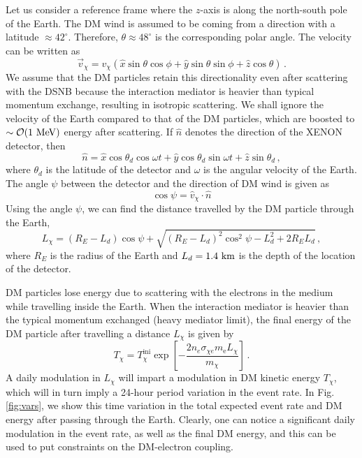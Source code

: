 \documentclass[prd,aps,twocolumn,tightenlines,notitlepage,nofootinbib,preprintnumbers,letterpaper,superscriptaddress]{revtex4-2}
\newcommand{\km}{{\rm\ km}}
\newcommand{\MeV}{{\rm\ MeV}}
\newcommand{\mchi}{m_\chi}
\newcommand{\sce}{\sigma_{\chi e}}
\newcommand{\mel}{m_\mathrm{e}}
\begin{document}
Let us consider a reference frame where the $z$-axis is along the north-south pole of the Earth. The DM wind is assumed to be coming from a direction with a latitude $\approx 42^\circ$. Therefore, $\theta \approx 48^\circ$ is the corresponding polar angle. The velocity can be written as
\begin{equation}
    \Vec{v}_\chi = v_\chi (\hat{x} \sin\theta \cos\phi + \hat{y} \sin\theta \sin\phi + \hat{z} \cos\theta)\,.
\end{equation}
We assume that the DM particles retain this directionality even after scattering with the DSNB because the interaction mediator is heavier than typical momentum exchange, resulting in isotropic scattering. We shall ignore the velocity of the Earth compared to that of the DM particles, which are boosted to $\sim \mathcal{O}(1\MeV)$ energy after scattering. If $\hat{n}$ denotes the direction of the XENON detector, then
\begin{equation}
    \hat{n} = \hat{x} \cos{\theta_d} \cos{\omega t} + \hat{y} \cos{\theta_d} \sin{\omega t} + \hat{z} \sin{\theta_d}\,,
\end{equation}
where $\theta_d$ is the latitude of the detector and $\omega$ is the angular velocity of the Earth. The angle $\psi$ between the detector and the direction of DM wind is given as
\begin{equation}
    \cos\psi = \hat{v}_\chi\cdot\hat{n} 
\end{equation}
Using the angle $\psi$, we can find the distance travelled by the DM particle through the Earth,
\begin{equation}
    L_\chi = (R_E - L_d)\cos\psi + \sqrt{(R_E - L_d)^2\cos^2\psi - L_d^2 + 2R_EL_d}\,,
\end{equation}
where $R_E$ is the radius of the Earth and $L_d=1.4\km$ is the depth of the location of the detector.

DM particles lose energy due to scattering with the electrons in the medium while travelling inside the Earth. When the interaction mediator is heavier than the typical momentum exchanged (heavy mediator limit), the final energy of the DM particle after travelling a distance $L_\chi$ is given by
\begin{equation}
    T_\chi = T_\chi^\text{ini} \exp\left[-\frac{2n_e\sce \mel L_\chi}{\mchi}\right]\,.
\end{equation}
A daily modulation in $L_\chi$ will impart a modulation in DM kinetic energy $T_\chi$, which will in turn imply a 24-hour period variation in the event rate. In Fig.\,\ref{fig:vars}, we show this time variation in the total expected event rate and DM energy after passing through the Earth. Clearly, one can notice a significant daily modulation in the event rate, as well as the final DM energy, and this can be used to put constraints on the DM-electron coupling.
\end{document}

